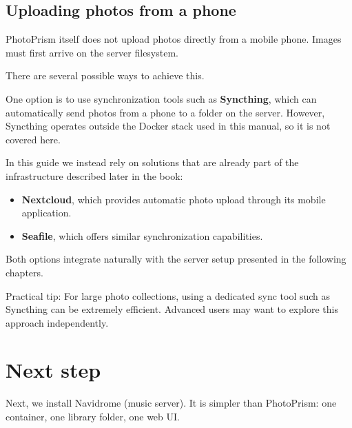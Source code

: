 \subsection{Uploading photos from a phone}

PhotoPrism itself does not upload photos directly from a mobile phone.
Images must first arrive on the server filesystem.

There are several possible ways to achieve this.

One option is to use synchronization tools such as \textbf{Syncthing}, which can automatically send photos from a phone to a folder on the server.
However, Syncthing operates outside the Docker stack used in this manual, so it is not covered here.

In this guide we instead rely on solutions that are already part of the infrastructure described later in the book:

\begin{itemize}
\item \textbf{Nextcloud}, which provides automatic photo upload through its mobile application.
\item \textbf{Seafile}, which offers similar synchronization capabilities.
\end{itemize}

Both options integrate naturally with the server setup presented in the following chapters.

Practical tip:
For large photo collections, using a dedicated sync tool such as Syncthing can be extremely efficient.
Advanced users may want to explore this approach independently.


\section{Next step}
Next, we install Navidrome (music server). It is simpler than PhotoPrism:
one container, one library folder, one web UI. 
